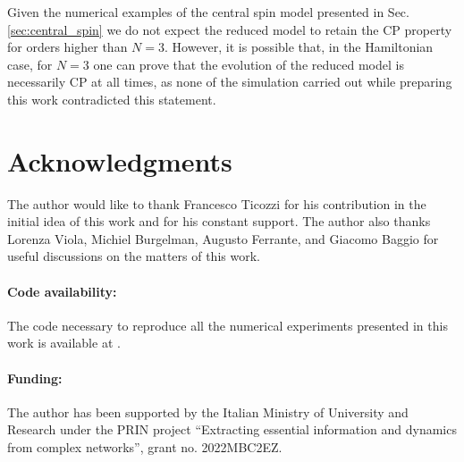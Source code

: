 \documentclass[10pt,aps,pra,twocolumn,showpacs,superscriptaddress,nobalancelastpage,notitlepage,nofootinbib,longbibliography]{revtex4-2}
\begin{document}
Given the numerical examples of the central spin model presented in Sec. \ref{sec:central_spin} we do not expect the reduced model to retain the CP property for orders higher than $N=3$. However, it is possible that, in the Hamiltonian case, for $N=3$ one can prove that the evolution of the reduced model is necessarily CP at all times, as none of the simulation carried out while preparing this work contradicted this statement. 


\section{Acknowledgments}
The author would like to thank Francesco Ticozzi for his contribution in the initial idea of this work and for his constant support. The author also thanks Lorenza Viola, Michiel Burgelman, Augusto Ferrante, and Giacomo Baggio for useful discussions on the matters of this work.

\paragraph{Code availability:} The code necessary to reproduce all the numerical experiments presented in this work is available at \cite{Myrepo}. 

\paragraph{Funding:}
The author has been supported by the Italian Ministry of University and Research under the PRIN project “Extracting essential information and dynamics from complex networks”, grant no. 2022MBC2EZ.



\onecolumngrid
\appendix

\end{document}

